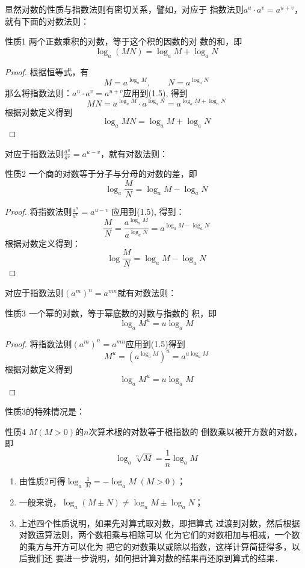 显然对数的性质与指数法则有密切关系，譬如，对应于
指数法则$a^u\cdot a^v=a^{u+v}$，就有下面的对数法则：

\begin{blk}{性质1}
    两个正数乘积的对数，等于这个积的因数的对
数的和，即
\[\log_a(MN)=\log_a M+\log_a N\]
\end{blk}

\begin{proof}
    根据恒等式，有
    \begin{equation}
        M=a^{\log_a M},\qquad N=a^{\log_a N}
    \end{equation}
    那么将指数法则：$a^u\cdot a^v=a^{u+v}$应用到(1.5), 得到
\[MN=a^{\log_a M}\cdot a^{\log_a N}=a^{\log_a M+\log_a N}\]
    根据对数定义得到
    \[\log_a MN = \log_a M + \log_a N\]
\end{proof}    

对应于指数法则$\frac{a^u}{a^v}=a^{u-v}$，就有对数法则：
    
\begin{blk}{性质2}
    一个商的对数等于分子与分母的对数的差，即
    \[\log_a \frac{M}{N}=\log_a M-\log_a N\]
\end{blk}

\begin{proof}
将指数法则$\frac{a^u}{a^v}=a^{u-v}$
应用到(1.5), 得到：
\[\frac{M}{N}=\frac{a^{\log_a M}}{a^{\log_a N}}=a^{\log_a M-\log_a N}\]
根据对数定义得到：
\[\log\frac{M}{N}=\log_a M -\log_a N\]
\end{proof}    

对应于指数法则$(a^m)^n=a^{mn}$就有对数法则： 
\begin{blk}{性质3}
    一个幂的对数，等于幂底数的对数与指数的
积，即
\[\log_a M^u =u\log_a M\]
\end{blk}
  
\begin{proof}
    将指数法则$(a^m)^n=a^{mn}$应用到(1.5)得到
\[M^u=\left(a^{\log_a M}\right)^u=a^{u\log_a M}\]
根据对数定义得到
\[\log_a M^u = u\log_a M\]
\end{proof}
    
性质3的特殊情况是：

\begin{blk}{性质4}
 $M(M>0)$的$n$次算术根的对数等于根指数的
倒数乘以被开方数的对数，即
\[\log_a\sqrt[n]{M}=\frac{1}{n}\log_a M\]
\end{blk}

\begin{rmk}
    \begin{enumerate}
        \item 由性质2可得$\log_a\frac{1}{M}=-\log_a M\; (M>0)$；
        \item 一般来说，$\log_a(M\pm N)\ne \log_a M\pm \log_a N$；
        \item 上述四个性质说明，如果先对算式取对数，即把算式
        过渡到对数，然后根据对数运算法则，两个数相乘与相除可以
        化为它们的对数相加与相减，一个数的乘方与开方可以化为
        把它的对数乘以或除以指数，这样计算简捷得多，以后我们还
        要进一步说明，如何把计算对数的结果再还原到算式的结果．
    \end{enumerate}
\end{rmk}
    
